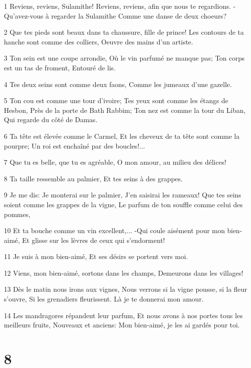 \par 1 Reviens, reviens, Sulamithe! Reviens, reviens, afin que nous te regardions. -Qu'avez-vous à regarder la Sulamithe Comme une danse de deux choeurs?
\par 2 Que tes pieds sont beaux dans ta chaussure, fille de prince! Les contours de ta hanche sont comme des colliers, Oeuvre des mains d'un artiste.
\par 3 Ton sein est une coupe arrondie, Où le vin parfumé ne manque pas; Ton corps est un tas de froment, Entouré de lis.
\par 4 Tes deux seins sont comme deux faons, Comme les jumeaux d'une gazelle.
\par 5 Ton cou est comme une tour d'ivoire; Tes yeux sont comme les étangs de Hesbon, Près de la porte de Bath Rabbim; Ton nez est comme la tour du Liban, Qui regarde du côté de Damas.
\par 6 Ta tête est élevée comme le Carmel, Et les cheveux de ta tête sont comme la pourpre; Un roi est enchaîné par des boucles!...
\par 7 Que tu es belle, que tu es agréable, O mon amour, au milieu des délices!
\par 8 Ta taille ressemble au palmier, Et tes seins à des grappes.
\par 9 Je me dis: Je monterai sur le palmier, J'en saisirai les rameaux! Que tes seins soient comme les grappes de la vigne, Le parfum de ton souffle comme celui des pommes,
\par 10 Et ta bouche comme un vin excellent,... -Qui coule aisément pour mon bien-aimé, Et glisse sur les lèvres de ceux qui s'endorment!
\par 11 Je suis à mon bien-aimé, Et ses désirs se portent vers moi.
\par 12 Viens, mon bien-aimé, sortons dans les champs, Demeurons dans les villages!
\par 13 Dès le matin nous irons aux vignes, Nous verrons si la vigne pousse, si la fleur s'ouvre, Si les grenadiers fleurissent. Là je te donnerai mon amour.
\par 14 Les mandragores répandent leur parfum, Et nous avons à nos portes tous les meilleurs fruits, Nouveaux et anciens: Mon bien-aimé, je les ai gardés pour toi.

\chapter{8}

